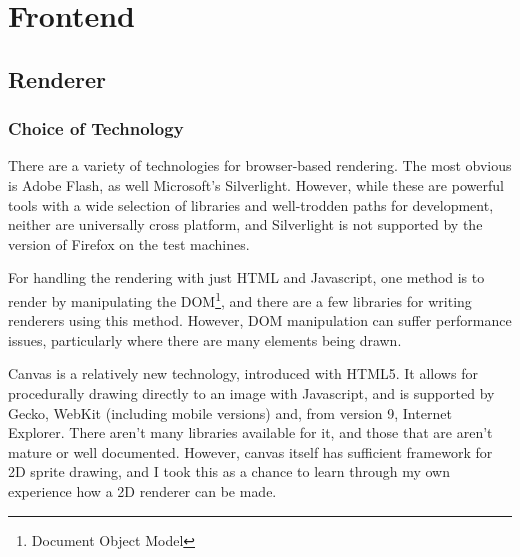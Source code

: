 \documentclass[12pt]{amsart}
\begin{document}
\section{Frontend}
  \subsection{Renderer}
    \subsubsection{Choice of Technology}
      \begin{flushleft}
        There are a variety of technologies for browser-based rendering. The
        most obvious is Adobe Flash, as well Microsoft's Silverlight. However,
        while these are powerful tools with a wide selection of libraries and
        well-trodden paths for development, neither are universally cross
        platform, and Silverlight is not supported by the version of Firefox
        on the test machines.

        For handling the rendering with just HTML and Javascript, one method is
        to render by manipulating the DOM\footnote{Document Object Model}, and
        there are a few libraries for writing renderers using this method.
        However, DOM manipulation can suffer performance issues, particularly
        where there are many elements being drawn.

        Canvas is a relatively new technology, introduced with HTML5. It allows
        for procedurally drawing directly to an image with Javascript, and is
        supported by Gecko, WebKit (including mobile versions) and, from version
        9, Internet Explorer. There aren't many libraries available for it, and
        those that are aren't mature or well documented. However, canvas itself
        has sufficient framework for 2D sprite drawing, and I took this as a
        chance to learn through my own experience how a 2D renderer can be made.
      \end{flushleft}
\end{document}
